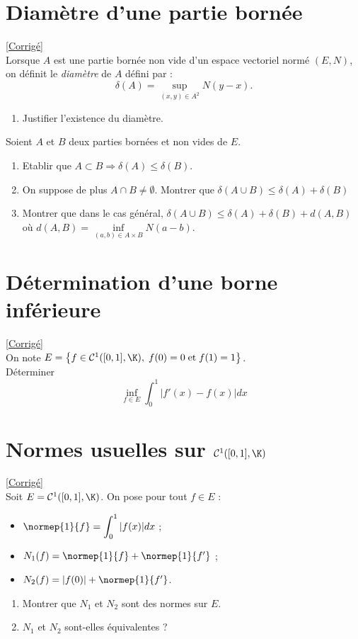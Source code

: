 \documentclass{book}
\begin{document}
	\section{Diamètre d'une partie bornée}
	\textcolor{blue}{\hyperref[sec:diametre-dune-partie-bornee]{[Corrigé]}}\\
	\label{Diamètre d'une partie bornée}
	Lorsque $A$ est une partie bornée non vide d'un espace vectoriel normé $(E,N)$, on définit le \textit{diamètre} de $A$ défini par : $$\delta(A)=\sup_{(x,y)\in A^2} N(y-x).$$
	\begin{enumerate}
		\item Justifier l'existence du diamètre.
	\end{enumerate}
	Soient $A$ et $B$ deux parties bornées et non vides de $E$.
	\begin{enumerate}[resume]
		\item Etablir que $A\subset B \Rightarrow \delta(A)\leq\delta(B)$.
		\item On suppose de plus $A\cap B\ne \emptyset$. Montrer que $\delta(A\cup B)\leq\delta(A)+\delta(B)$
		\item Montrer que dans le cas général, $\delta(A\cup B)\leq \delta(A)+\delta(B)+d(A,B)$ où $d(A,B)=\inf\limits_{(a,b)\in A\times B}N(a-b)$.
	\end{enumerate}
	
	\section{Détermination d'une borne inférieure}
	\textcolor{blue}{\hyperref[sec:determination-dune-borne-inferieure]{[Corrigé]}}\\
	\label{Détermination d'une borne inférieure}
	On note $E=\left\{f\in\mathcal{C}^1([0,1],\K),\;f(0)=0 \; \text{et} \; f(1)=1\right\}$.\\
	Déterminer $$\inf_{f\in E}\int_0^1|f'(x)-f(x)|dx$$
	
	\section{Normes usuelles sur $\mathcal C^1([0,1],\K)$}
	\textcolor{blue}{\hyperref[sec:normes-usuelles-sur-mathcalc101k]{[Corrigé]}}\\
	\label{Normes usuelles sur C1}
	Soit $E=\mathcal C^1([0,1],\K)$. On pose pour tout $f\in E$ : 
	\begin{itemize}[leftmargin=*]
		\item $\displaystyle\normep{1}{f}=\int_0^1|f(x)|dx$ ;
		\item $N_1(f)=\normep{1}{f}+\normep{1}{f'}$ ;
		\item $N_2(f)=|f(0)|+\normep{1}{f'}$.
	\end{itemize}
	\begin{enumerate}
		\item Montrer que $N_1$ et $N_2$ sont des normes sur $E$.
		\item $N_1$ et $N_2$ sont-elles équivalentes ?
	\end{enumerate}
	
\end{document}
